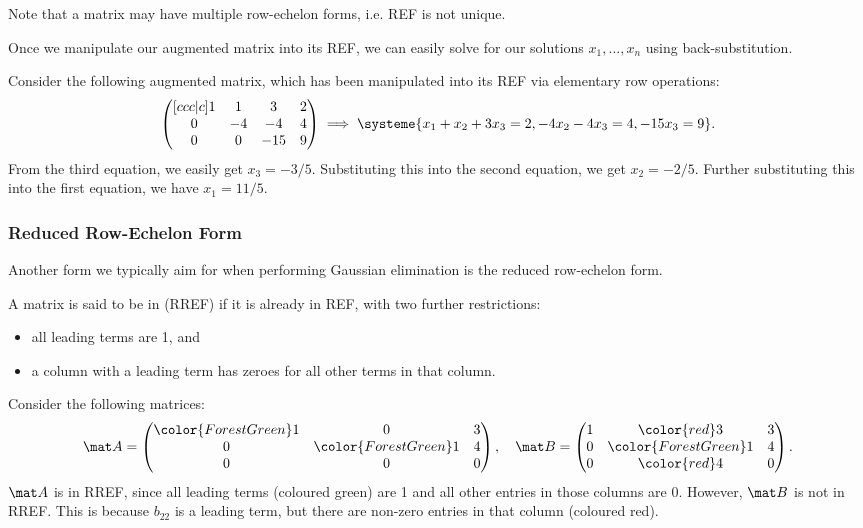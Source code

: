 Note that a matrix may have multiple row-echelon forms, i.e. REF is not unique.

Once we manipulate our augmented matrix into its REF, we can easily solve for our solutions $x_1, \dots, x_n$ using back-substitution.

\begin{example}
    Consider the following augmented matrix, which has been manipulated into its REF via elementary row operations: \[\begin{pmatrix}[ccc|c]1 & 1 & 3 & 2 \\ 0 & -4 & -4 & 4 \\ 0 & 0 & -15 & 9\end{pmatrix} \implies \systeme{x_1 + x_2 + 3x_3 = 2, -4x_2 - 4x_3 = 4, -15x_3 = 9}.\] From the third equation, we easily get $x_3 = -3/5$. Substituting this into the second equation, we get $x_2 = -2/5$. Further substituting this into the first equation, we have $x_1 = 11/5$.
\end{example}

\subsubsection{Reduced Row-Echelon Form}

Another form we typically aim for when performing Gaussian elimination is the reduced row-echelon form.

\begin{definition}
    A matrix is said to be in  (RREF) if it is already in REF, with two further restrictions:
    \begin{itemize}
        \item all leading terms are 1, and
        \item a column with a leading term has zeroes for all other terms in that column.
    \end{itemize}
\end{definition}

\begin{example}
    Consider the following matrices: \[\mat A = \begin{pmatrix}{\color{ForestGreen}1} & 0 & 3 \\ 0 & {\color{ForestGreen}1} & 4 \\ 0 & 0 & 0\end{pmatrix}, \quad \mat B = \begin{pmatrix}1 & {\color{red}3} & 3 \\ 0 & {\color{ForestGreen}1} & 4 \\ 0 & {\color{red}4} & 0\end{pmatrix}.\] $\mat A$ is in RREF, since all leading terms (coloured green) are 1 and all other entries in those columns are 0. However, $\mat B$ is not in RREF. This is because $b_{22}$ is a leading term, but there are non-zero entries in that column (coloured red).
\end{example}

